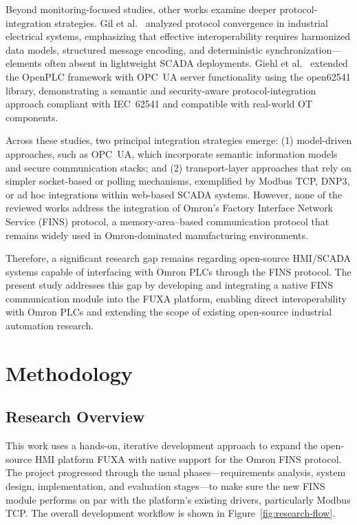 Beyond monitoring-focused studies, other works examine deeper protocol-integration strategies. Gil et al.~\cite{gil2022converging} analyzed protocol convergence in industrial electrical systems, emphasizing that effective interoperability requires harmonized data models, structured message encoding, and deterministic synchronization—elements often absent in lightweight SCADA deployments. Giehl et al.~\cite{giehl2024emuflex} extended the OpenPLC framework with OPC~UA server functionality using the open62541 library, demonstrating a semantic and security-aware protocol-integration approach compliant with IEC~62541 and compatible with real-world OT components.

Across these studies, two principal integration strategies emerge: (1) model-driven approaches, such as OPC~UA, which incorporate semantic information models and secure communication stacks; and (2) transport-layer approaches that rely on simpler socket-based or polling mechanisms, exemplified by Modbus TCP, DNP3, or ad hoc integrations within web-based SCADA systems. However, none of the reviewed works address the integration of Omron's Factory Interface Network Service (FINS) protocol, a memory-area–based communication protocol that remains widely used in Omron-dominated manufacturing environments.

Therefore, a significant research gap remains regarding open-source HMI/SCADA systems capable of interfacing with Omron PLCs through the FINS protocol. The present study addresses this gap by developing and integrating a native FINS communication module into the FUXA platform, enabling direct interoperability with Omron PLCs and extending the scope of existing open-source industrial automation research.

\section{Methodology}

\subsection{Research Overview}
This work uses a hands-on, iterative development approach to expand the open-source HMI platform FUXA with native support for the Omron FINS protocol.
The project progressed through the usual phases—requirements analysis, system design, implementation, and evaluation stages—to make sure the new FINS module performs on par with the platform’s existing drivers, particularly Modbus TCP.
The overall development workflow is shown in Figure~\ref{fig:research-flow}.


